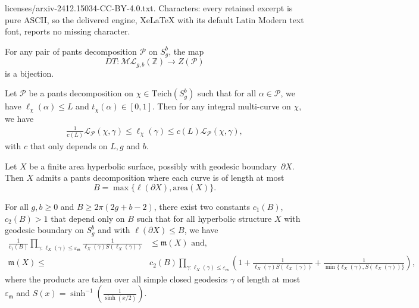 \documentclass[10pt,a4paper]{amsart}
\begin{document}
licenses/arxiv-2412.15034-CC-BY-4.0.txt. Characters: every retained excerpt is pure ASCII, so the delivered engine, XeLaTeX with its default Latin Modern text font, reports no missing character.
\begin{theorem}\label{thm:DehnThurston}
    For any pair of pants decomposition $\mathcal{P}$ on $S_g^{b}$, the map
    \[
        DT : \mathcal{ML}_{g,b}(\mathbb{Z}) \to Z(\mathcal{P})
    \]
    is a bijection.
\end{theorem}

\begin{theorem}
    Let $\mathcal{P}$ be a pants decomposition on $\chi \in \mathrm{Teich}(S_g^b)$ such that for all $\alpha \in \mathcal{P}$, we have $\ell_\chi(\alpha) \leqslant L$ and $t_\chi(\alpha) \in [0,1]$. Then for any integral multi-curve on $\chi$, we have
    \begin{align}
        \frac{1}{c(L)}\mathcal{L}_\mathcal{P}(\chi,\gamma) \leqslant \ell_\chi(\gamma) \leqslant c(L) \mathcal{L}_\mathcal{P}(\chi,\gamma),\label{in:combiLength}
    \end{align}
    with $c$ that only depends on $L, g$ and $b$.
\end{theorem}

\begin{theorem}\label{theorem:Bers}
    Let $X$ be a finite area hyperbolic surface, possibly with geodesic boundary~$\partial X$. Then $X$ admits a pants decomposition where each curve is of length at most
    \[
        B = \max\{ \ell(\partial X), \mathrm{area}(X) \}.    
    \]
     
\end{theorem}

\begin{proposition}\label{prop:controleMesureThurston}
    For all $g,b \geqslant 0$ and $B \geqslant 2\pi(2g+b-2)$, there exist two constants $c_1(B)$, $c_2(B)>1$ that depend only on $B$ such that for all hyperbolic structure $X$ with geodesic boundary on $S_g^b$ and with $\ell(\partial X) \leqslant B$, we have
    \begin{align*}
        \frac{1}{c_1(B)} \prod_{\gamma : \ell_X(\gamma)\leqslant \varepsilon_{\mathfrak{m}}} \frac{1}{\ell_X(\gamma)S(\ell_X(\gamma))} & \leqslant \mathfrak{m}(X) \mbox{ and,}\\
        \mathfrak{m}(X) \leqslant & c_2(B) \prod_{\gamma : \ell_X(\gamma)\leqslant \varepsilon_{\mathfrak{m}}} \left( 1 + \frac{1}{\ell_X(\gamma)S(\ell_X(\gamma))} + \frac{1}{\min\{\ell_X(\gamma),S(\ell_X(\gamma))\}} \right),
    \end{align*}
    where the products are taken over all simple closed geodesics $\gamma$ of length at most $\varepsilon_{\mathfrak{m}}$ and $S(x)=\sinh^{-1}\left( \frac{1}{\sinh(x/2)} \right)$.
\end{proposition}
\end{document}
